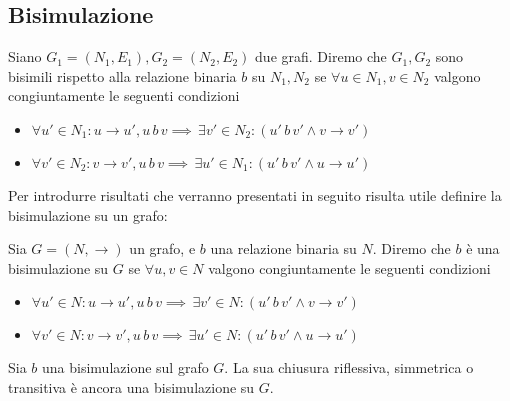 \subsection{Bisimulazione}
\begin{definition}
    Siano $G_1 = (N_1, E_1), G_2 = (N_2, E_2)$ due grafi. Diremo che $G_1, G_2$ sono bisimili rispetto alla relazione binaria $b$ su $N_1, N_2$ se $\forall u \in N_1, v \in N_2$ valgono congiuntamente le seguenti condizioni
    \begin{itemize}
        \item $\forall u' \in N_1 : u \to u', u \,b\, v \implies \,\exists v' \in N_2 : (u' \,b\, v' \land v \to v')$
        \item $\forall v' \in N_2 : v \to v', u \,b\, v \implies \,\exists u' \in N_1 : (u' \,b\, v' \land u \to u')$
    \end{itemize}
\end{definition}
Per introdurre risultati che verranno presentati in seguito risulta utile definire la bisimulazione su un grafo:
\begin{definition}
    Sia $G = (N, \to)$ un grafo, e $b$ una relazione binaria su $N$. Diremo che $b$ è una bisimulazione su $G$ se $\forall u,v \in N$ valgono congiuntamente le seguenti condizioni
    \begin{itemize}
        \item $\forall u' \in N : u \to u', u \,b\, v \implies \,\exists v' \in N : (u' \,b\, v' \land v \to v')$
        \item $\forall v' \in N : v \to v', u \,b\, v \implies \,\exists u' \in N : (u' \,b\, v' \land u \to u')$
    \end{itemize}
\end{definition}
\begin{proposition}
    Sia $b$ una bisimulazione sul grafo $G$. La sua chiusura riflessiva, simmetrica o transitiva è ancora una bisimulazione su $G$.
\end{proposition}
